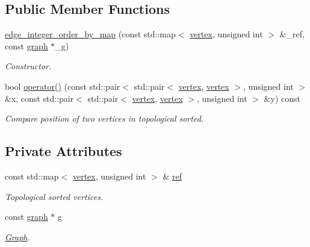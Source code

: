 \subsection*{Public Member Functions}
\begin{DoxyCompactItemize}
\item 
\hyperlink{classedge__integer__order__by__map_a0009ff6e94b0b34f1307c252ccc2ce44}{edge\+\_\+integer\+\_\+order\+\_\+by\+\_\+map} (const std\+::map$<$ \hyperlink{graph_8hpp_abefdcf0544e601805af44eca032cca14}{vertex}, unsigned int $>$ \&\+\_\+ref, const \hyperlink{structgraph}{graph} $\ast$\+\_\+g)
\begin{DoxyCompactList}\small\item\em Constructor. \end{DoxyCompactList}\item 
bool \hyperlink{classedge__integer__order__by__map_a435b16cd11eeb9cefab8034cd49339ab}{operator()} (const std\+::pair$<$ std\+::pair$<$ \hyperlink{graph_8hpp_abefdcf0544e601805af44eca032cca14}{vertex}, \hyperlink{graph_8hpp_abefdcf0544e601805af44eca032cca14}{vertex} $>$, unsigned int $>$ \&x, const std\+::pair$<$ std\+::pair$<$ \hyperlink{graph_8hpp_abefdcf0544e601805af44eca032cca14}{vertex}, \hyperlink{graph_8hpp_abefdcf0544e601805af44eca032cca14}{vertex} $>$, unsigned int $>$ \&y) const
\begin{DoxyCompactList}\small\item\em Compare position of two vertices in topological sorted. \end{DoxyCompactList}\end{DoxyCompactItemize}
\subsection*{Private Attributes}
\begin{DoxyCompactItemize}
\item 
const std\+::map$<$ \hyperlink{graph_8hpp_abefdcf0544e601805af44eca032cca14}{vertex}, unsigned int $>$ \& \hyperlink{classedge__integer__order__by__map_a5438a43273d4a572f91cbe16083976b8}{ref}
\begin{DoxyCompactList}\small\item\em Topological sorted vertices. \end{DoxyCompactList}\item 
const \hyperlink{structgraph}{graph} $\ast$ \hyperlink{classedge__integer__order__by__map_a17b475d7942cce1cd0a41a104f727ac7}{g}
\begin{DoxyCompactList}\small\item\em \hyperlink{structGraph}{Graph}. \end{DoxyCompactList}\end{DoxyCompactItemize}


